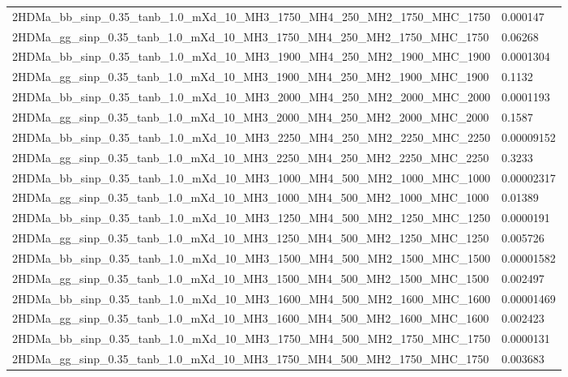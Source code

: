 \begin{table}
\begin{center}
\begin{adjustbox}{width=\textwidth}
\begin{tabular}{|l|l|}
        2HDMa\_bb\_sinp\_0.35\_tanb\_1.0\_mXd\_10\_MH3\_1750\_MH4\_250\_MH2\_1750\_MHC\_1750 & 0.000147    \\
        2HDMa\_gg\_sinp\_0.35\_tanb\_1.0\_mXd\_10\_MH3\_1750\_MH4\_250\_MH2\_1750\_MHC\_1750 & 0.06268     \\
        2HDMa\_bb\_sinp\_0.35\_tanb\_1.0\_mXd\_10\_MH3\_1900\_MH4\_250\_MH2\_1900\_MHC\_1900 & 0.0001304   \\
        2HDMa\_gg\_sinp\_0.35\_tanb\_1.0\_mXd\_10\_MH3\_1900\_MH4\_250\_MH2\_1900\_MHC\_1900 & 0.1132      \\
        2HDMa\_bb\_sinp\_0.35\_tanb\_1.0\_mXd\_10\_MH3\_2000\_MH4\_250\_MH2\_2000\_MHC\_2000 & 0.0001193   \\
        2HDMa\_gg\_sinp\_0.35\_tanb\_1.0\_mXd\_10\_MH3\_2000\_MH4\_250\_MH2\_2000\_MHC\_2000 & 0.1587      \\
        2HDMa\_bb\_sinp\_0.35\_tanb\_1.0\_mXd\_10\_MH3\_2250\_MH4\_250\_MH2\_2250\_MHC\_2250 & 0.00009152  \\
        2HDMa\_gg\_sinp\_0.35\_tanb\_1.0\_mXd\_10\_MH3\_2250\_MH4\_250\_MH2\_2250\_MHC\_2250 & 0.3233      \\
        2HDMa\_bb\_sinp\_0.35\_tanb\_1.0\_mXd\_10\_MH3\_1000\_MH4\_500\_MH2\_1000\_MHC\_1000 & 0.00002317  \\
        2HDMa\_gg\_sinp\_0.35\_tanb\_1.0\_mXd\_10\_MH3\_1000\_MH4\_500\_MH2\_1000\_MHC\_1000 & 0.01389     \\
        2HDMa\_bb\_sinp\_0.35\_tanb\_1.0\_mXd\_10\_MH3\_1250\_MH4\_500\_MH2\_1250\_MHC\_1250 & 0.0000191   \\
        2HDMa\_gg\_sinp\_0.35\_tanb\_1.0\_mXd\_10\_MH3\_1250\_MH4\_500\_MH2\_1250\_MHC\_1250 & 0.005726    \\
        2HDMa\_bb\_sinp\_0.35\_tanb\_1.0\_mXd\_10\_MH3\_1500\_MH4\_500\_MH2\_1500\_MHC\_1500 & 0.00001582  \\
        2HDMa\_gg\_sinp\_0.35\_tanb\_1.0\_mXd\_10\_MH3\_1500\_MH4\_500\_MH2\_1500\_MHC\_1500 & 0.002497    \\
        2HDMa\_bb\_sinp\_0.35\_tanb\_1.0\_mXd\_10\_MH3\_1600\_MH4\_500\_MH2\_1600\_MHC\_1600 & 0.00001469  \\
        2HDMa\_gg\_sinp\_0.35\_tanb\_1.0\_mXd\_10\_MH3\_1600\_MH4\_500\_MH2\_1600\_MHC\_1600 & 0.002423    \\
        2HDMa\_bb\_sinp\_0.35\_tanb\_1.0\_mXd\_10\_MH3\_1750\_MH4\_500\_MH2\_1750\_MHC\_1750 & 0.0000131   \\
        2HDMa\_gg\_sinp\_0.35\_tanb\_1.0\_mXd\_10\_MH3\_1750\_MH4\_500\_MH2\_1750\_MHC\_1750 & 0.003683    \\

\end{tabular}
\end{adjustbox}
\end{center}
\end{table}
